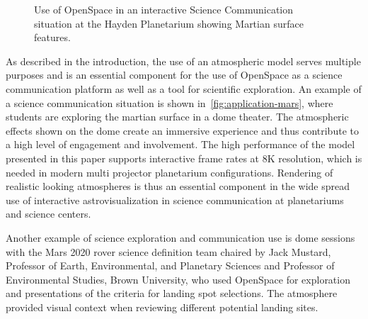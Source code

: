 \documentclass[journal]{vgtc}                %
\newcommand{\anderscomment}[1]{\textbf{[AY~} \textcolor{cyan}{#1} \textbf{~]}}
\newcommand{\chuckcomment}[1]{\textbf{[CH~} \textcolor{green}{#1} \textbf{~]}}
\newcommand{\review}[1]{{\color{blue}#1}}
\begin{document}
\begin{figure}
 \centering
 \vspace*{-6mm}
 \caption{Use of OpenSpace in an interactive Science Communication situation at the Hayden Planetarium showing Martian surface features.}
 \label{fig:application-mars}
 \vspace*{-4mm} 
\end{figure}
As described in the introduction\review{,} the use of an atmospheric model serves multiple purposes and is an essential component for the use of OpenSpace as a science communication platform as well as a tool for scientific exploration. An example of a science communication situation is shown in~\autoref{fig:application-mars}\review{,} where students are exploring the martian surface in a dome theater. The atmospheric effects shown on the dome create an immersive experience and thus \review{contribute} to a high level of engagement and involvement. The high performance of the model presented in this paper supports interactive frame rates at 8K resolution, which is needed in modern multi projector planetarium configurations. Rendering of realistic looking atmospheres is thus an essential component in the wide spread use of interactive astrovisualization in science communication at planetariums and science centers. 

Another example of science exploration and communication use is dome sessions with the Mars 2020 rover science definition team chaired by Jack Mustard, Professor of Earth, Environmental, and Planetary Sciences and Professor of Environmental Studies, Brown University, who used OpenSpace for exploration and presentations of the criteria for landing spot selections. The atmosphere provided visual context when reviewing different potential landing sites.
\end{document}
